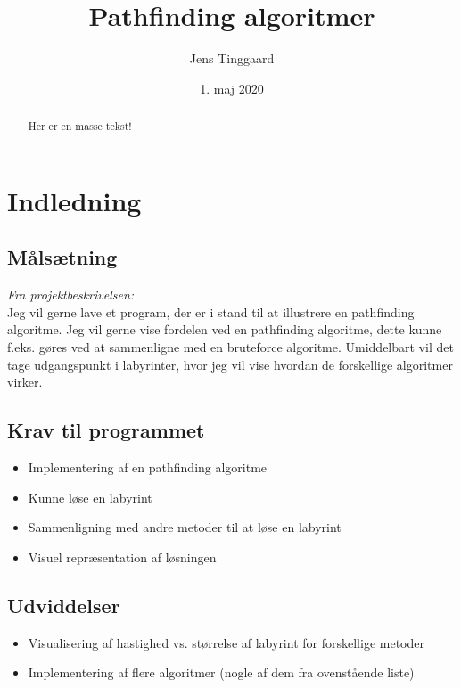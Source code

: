 \documentclass[a4paper, 12pt]{article}
\date{1. maj 2020}
\title{Pathfinding algoritmer}
\author{Jens Tinggaard}
\begin{document}
\thispagestyle{empty}
\maketitle


\begin{abstract}
  Her er en masse tekst!
\end{abstract}

\tableofcontents
\setlength{\parskip}{1em} %


\newpage
\section{Indledning}
\subsection{Målsætning}
\textit{Fra projektbeskrivelsen:}\\
Jeg vil gerne lave et program, der er i stand til at illustrere en pathfinding algoritme. Jeg vil gerne vise fordelen ved en pathfinding algoritme, dette kunne f.eks. gøres ved at sammenligne med en bruteforce algoritme. Umiddelbart vil det tage udgangspunkt i labyrinter, hvor jeg vil vise hvordan de forskellige algoritmer virker.
\subsection{Krav til programmet}
\begin{itemize}
  \item Implementering af en pathfinding algoritme
  \item Kunne løse en labyrint
  \item Sammenligning med andre metoder til at løse en labyrint
  \item Visuel repræsentation af løsningen
\end{itemize}
\subsection{Udviddelser}
\begin{itemize}
  \item Visualisering af hastighed vs. størrelse af labyrint for forskellige metoder
  \item Implementering af flere algoritmer (nogle af dem fra ovenstående liste)
\end{itemize}
\end{document}
